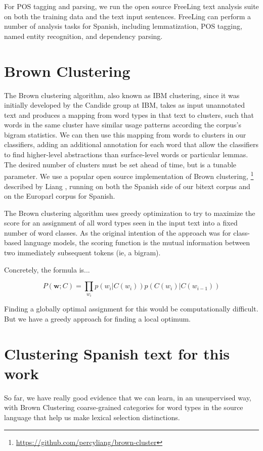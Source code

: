 For POS tagging and parsing, we run the open source FreeLing text analysis
suite \cite{padro12} on both the training data and the text input sentences.
FreeLing can perform a number of analysis tasks for Spanish, including
lemmatization, POS tagging, named entity recognition, and dependency parsing.

\section{Brown Clustering}
The Brown clustering algorithm, also known as IBM clustering, since it was
initially developed by the Candide group at IBM, takes as input unannotated
text and produces a mapping from word types in that text to clusters, such that
words in the same cluster have similar usage patterns according the corpus's
bigram statistics.
We can then use this mapping from words to clusters in our classifiers, adding
an additional annotation for each word that allow the classifiers to find
higher-level abstractions than surface-level words or particular lemmas.
The desired number of clusters must be set ahead of time, but is a tunable
parameter.
We use a popular open source implementation of Brown clustering,
\footnote{\url{https://github.com/percyliang/brown-cluster}} described by
Liang \cite{Liang05semi-supervisedlearning}, running on both the Spanish
side of our bitext corpus and on the Europarl corpus \cite{europarl} for
Spanish.

The Brown clustering algorithm uses greedy optimization to try to maximize the
score for an assignment of all word types seen in the input text into a fixed
number of word classes. As the original intention of the approach was for
class-based language models, the scoring function is the mutual information
between two immediately subsequent tokens (ie, a bigram).

Concretely, the formula is...

\begin{equation} \label{eq:brownclassprob}
P(\boldsymbol{w}; C) = \prod_{w_i} p(w_i | C(w_i)) p(C(w_i) | C(w_{i-1}))
\end{equation}

Finding a globally optimal assignment for this would be computationally
difficult. But we have a greedy approach for finding a local optimum.


\section{Clustering Spanish text for this work}
So far, we have really good evidence that we can learn, in an unsupervised way,
with Brown Clustering coarse-grained categories for word types in the source
language that help us make lexical selection distinctions.

